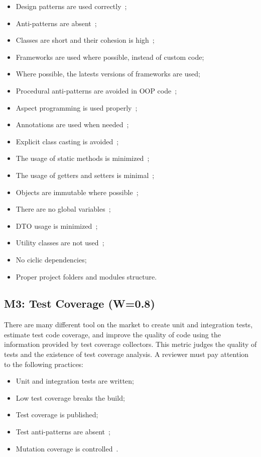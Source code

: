 \documentclass[12pt,oneside]{article}
\begin{document}
\begin{itemize}
\item Design patterns are used correctly~\citep{gamma1993design,holub2004holub,freeman2008head,fowler2003patterns};
\item Anti-patterns are absent~\citep{jaafar2013mining};
\item Classes are short and their cohesion is high~\citep[pp.93-95]{e01};
\item Frameworks are used where possible, instead of custom code;
\item Where possible, the latests versions of frameworks are used;
\item Procedural anti-patterns are avoided in OOP code~\citep[pp.19-26]{e01};
\item Aspect programming is used properly~\citep[pp.210--212]{e01};
\item Annotations are used when needed~\citep[pp.163]{eo2};
\item Explicit class casting is avoided~\citep[pp.181--186]{eo2};
\item The usage of static methods is minimized~\citep[pp.117--145]{eo2};
\item The usage of getters and setters is minimal~\citep[pp.165--174]{eo1};
\item Objects are immutable where possible~\citep[pp.78--89]{eo2};
\item There are no global variables~\citep{yb-global-vars};
\item DTO usage is minimized~\citep[pp.179]{eo2};
\item Utility classes are not used~\citep[pp.40]{eo2};
\item No ciclic dependencies;
\item Proper project folders and modules structure.
\end{itemize}

\subsection{M3: Test Coverage (W=0.8)}

There are many different tool on the market to create unit and integration tests,
estimate test code coverage, and improve the quality of code using
the information provided by test coverage collectors. This metric judges
the quality of tests and the existence of test coverage analysis. A reviewer
must pay attention to the following practices:

\begin{itemize}
  \item Unit and integration tests are written;
  \item Low test coverage breaks the build;
  \item Test coverage is published;
  \item Test anti-patterns are absent~\citep{yb-test-anti};
  \item Mutation coverage is controlled~\citep{andrews2006using}.
\end{itemize}
\end{document}
